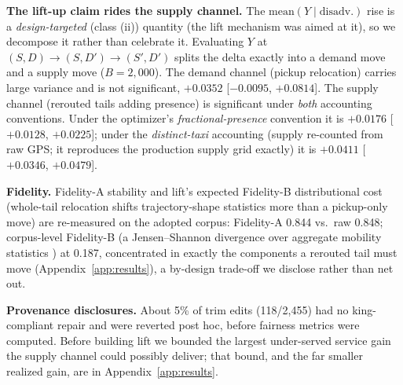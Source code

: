 \textbf{The lift-up claim rides the supply channel.} The
$\mathrm{mean}(Y \mid \mathrm{disadv.})$ rise is a
\emph{design-targeted} (class (ii)) quantity (the lift mechanism was aimed
at it), so we decompose it rather than celebrate it. Evaluating $Y$ at
$(S,D) \to (S,D') \to (S',D')$ splits the delta exactly into a demand move and
a supply move ($B{=}2{,}000$). The demand channel (pickup relocation) carries
large variance and is not significant, $+0.0352$ [$-0.0095$, $+0.0814$]. The
supply channel (rerouted tails adding presence) is significant under
\emph{both} accounting conventions. Under the optimizer's
\emph{fractional-presence} convention it is $+0.0176$ [$+0.0128$, $+0.0225$]; %
under the \emph{distinct-taxi} accounting (supply re-counted from raw GPS;
it reproduces the production supply grid exactly) it is $+0.0411$
[$+0.0346$, $+0.0479$].

\textbf{Fidelity.} Fidelity-A stability and lift's expected Fidelity-B
distributional cost (whole-tail relocation shifts trajectory-shape statistics
more than a pickup-only move) are re-measured on the adopted corpus:
Fidelity-A 0.844 vs.\ raw 0.848; corpus-level Fidelity-B (a Jensen--Shannon
divergence over aggregate mobility statistics \cite{feng2020simulate}) at
0.187, concentrated in exactly the components a rerouted tail must move
(Appendix~\ref{app:results}), a by-design trade-off we disclose rather than
net out.

\textbf{Provenance disclosures.} About 5\% of trim edits (118/2{,}455) had no
king-compliant repair and were reverted post hoc, before fairness metrics were 
computed. Before building lift we bounded the largest under-served service
gain the supply channel could possibly deliver; that bound, and the far
smaller realized gain, are in Appendix~\ref{app:results}.

